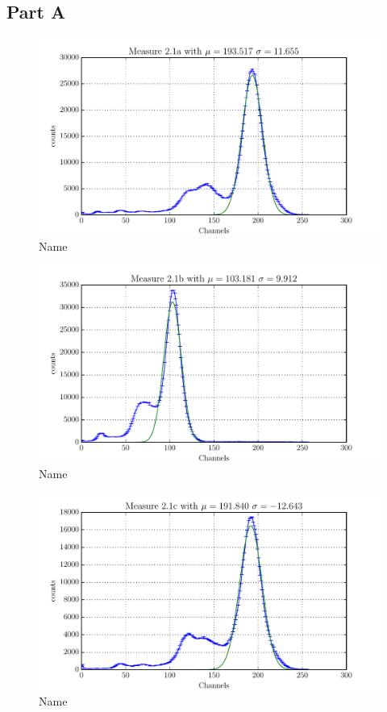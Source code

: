 \subsection{Part A}

\begin{figure}[htpb]
    \centering
    \includegraphics[width=0.8\linewidth]{analysis/figures/plot2_1a}
    \caption{Name}
    \label{fig:2_1a}
\end{figure}
\begin{figure}[htpb]
    \centering
    \includegraphics[width=0.8\linewidth]{analysis/figures/plot2_1b}
    \caption{Name}
    \label{fig:2_1a}
\end{figure}
\begin{figure}[htpb]
    \centering
    \includegraphics[width=0.8\linewidth]{analysis/figures/plot2_1c}
    \caption{Name}
    \label{fig:2_1a}
\end{figure}
